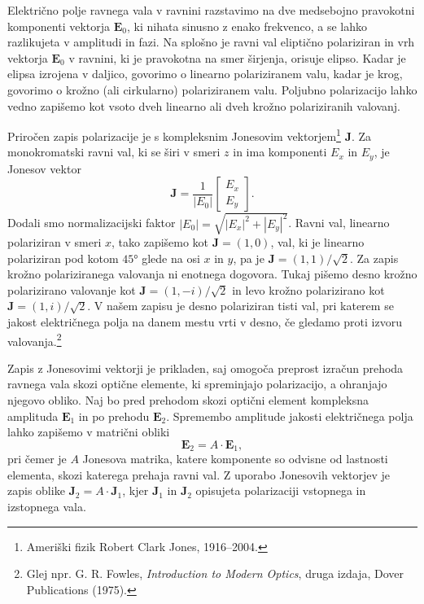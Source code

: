 Električno polje ravnega vala v ravnini razstavimo na dve medsebojno 
pravokotni komponenti vektorja $\mathbf{E}_0$, ki
nihata sinusno z enako frekvenco, a se lahko razlikujeta v amplitudi in fazi. 
Na splošno je ravni val eliptično polariziran in
vrh vektorja $\mathbf E_0$ v ravnini, ki je pravokotna 
na smer širjenja, orisuje elipso. Kadar je elipsa izrojena v daljico,
govorimo o linearno polariziranem valu,
kadar je krog, govorimo o krožno (ali cirkularno) polariziranem valu. 
Poljubno polarizacijo lahko vedno zapišemo kot vsoto dveh linearno ali dveh 
krožno polariziranih valovanj. 

Priročen zapis polarizacije je s kompleksnim Jonesovim 
vektorjem\footnote{Ameriški fizik Robert Clark Jones, 1916--2004.}
$\mathbf{J}$. Za monokromatski ravni val, ki se širi v smeri $z$ in ima 
komponenti $E_x$ in $E_y$, je Jonesov vektor
\begin{equation}
\mathbf{J}=\frac{1}{|E_{0}|}\left[\begin{array}{c}
E_{x}\\
E_{y}
\end{array}\right].
\end{equation}
Dodali smo normalizacijski faktor $|E_{0}|=\sqrt{|E_{x}|^{2}+|E_{y}|^{2}}$.
Ravni val, linearno polariziran v smeri $x$, tako zapišemo kot $\mathbf{J}=\left(1,0\right)$,
val, ki je linearno polariziran pod kotom $\ang{45}$ glede na osi
$x$ in $y$, pa je $\mathbf{J}=\left(1,1\right)/\sqrt{2}$.
Za zapis krožno polariziranega valovanja ni enotnega dogovora. Tukaj pišemo
desno krožno polarizirano valovanje kot 
$\mathbf{J}=\left(1,-i\right)/\sqrt{2}$ in
levo krožno polarizirano kot $\mathbf{J}=\left(1,i\right)/\sqrt{2}$.
V našem zapisu je desno polariziran tisti val, pri katerem se jakost električnega
polja na danem mestu vrti v desno, če gledamo proti izvoru valovanja.\footnote{Glej 
npr. G. R. Fowles, {\it Introduction to Modern Optics}, druga izdaja, Dover Publications (1975).}

Zapis z Jonesovimi vektorji je prikladen, saj omogoča preprost izračun
prehoda ravnega vala skozi optične elemente, ki spreminjajo polarizacijo,
a ohranjajo njegovo obliko. Naj bo pred prehodom skozi optični element kompleksna
amplituda $\mathbf{E}_1$ in po prehodu $\mathbf{E}_2$. Spremembo amplitude 
jakosti električnega polja lahko zapišemo v matrični obliki
\begin{equation}
\mathbf{E}_{2}=A\cdot\mathbf{E}_{1},
\end{equation}
pri čemer je $A$ Jonesova matrika, katere komponente so odvisne od
lastnosti elementa, skozi katerega prehaja ravni val. 
Z uporabo Jonesovih vektorjev je zapis oblike $\mathbf{J}_{2}=A\cdot\mathbf{J}_{1}$, 
kjer $\mathbf{J}_{1}$ in $\mathbf{J}_{2}$ opisujeta polarizaciji vstopnega in izstopnega vala. 


